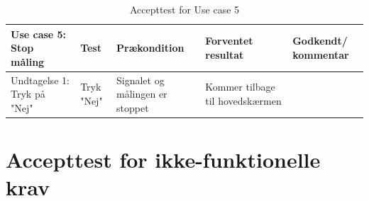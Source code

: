 \begin{table}[H]
\caption{Accepttest for Use case 5}\label{tab:tabel8}
\begin{tabular}{|>{\raggedright\arraybackslash}p{2.5cm}| >{\raggedright\arraybackslash}p{2.9cm} | >{\raggedright\arraybackslash}p{2.9cm} | >{\raggedright\arraybackslash}p{2.9cm} | >{\raggedright\arraybackslash}p{2.8cm} |}
   \hline
   \textbf{Use case 5: Stop måling } &\textbf{Test}& \textbf{Prækondition} & \textbf{Forventet resultat} & \textbf{Godkendt/ kommentar}\\ \hline
Undtagelse 1: Tryk på "Nej" &Tryk "Nej" & Signalet og målingen er stoppet & Kommer tilbage til hovedskærmen &\\\hline
\end{tabular}
\end{table}



\newpage

\newpage

\newpage

\section{Accepttest for ikke-funktionelle krav}

